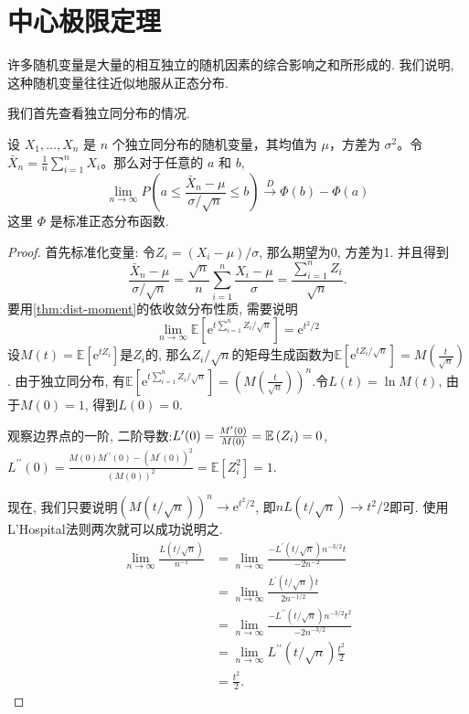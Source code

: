 \section{中心极限定理}

许多随机变量是大量的相互独立的随机因素的综合影响之和所形成的. 我们说明, 这种随机变量往往近似地服从正态分布.

我们首先查看独立同分布的情况. 

\begin{theorem}
    \label{thm:clt-iid}
    设 $X_1, \ldots, X_n$ 是 $n$ 个独立同分布的随机变量，其均值为 $\mu$，方差为 $\sigma^2$。令 $\bar{X}_n=\frac{1}{n} \sum_{i=1}^n X_i$。那么对于任意的 $a$ 和 $b$, 
    $$
    \lim _{n \rightarrow \infty} P\left(a \leq \frac{\bar{X}_n-\mu}{\sigma / \sqrt{n}} \leq b\right) \stackrel{D}{\longrightarrow} \Phi(b)-\Phi(a)
    $$
    这里 $\Phi$ 是标准正态分布函数. 
        \end{theorem}

    \begin{proof}
        首先标准化变量: 令$Z_i=\left(X_i-\mu\right) / \sigma$, 那么期望为0, 方差为1. 并且得到$$
            \frac{\bar{X}_n-\mu}{\sigma / \sqrt{n}}=\frac{\sqrt{n}}{n} \sum_{i=1}^n \frac{X_i-\mu}{\sigma}=\frac{\sum_{i=1}^n Z_i}{\sqrt{n}} .
            $$
            要用\cref{thm:dist-moment}的依收敛分布性质, 需要说明$$
            \lim _{n \rightarrow \infty} \mathbb{E}\left[\mathrm{e}^{t \sum_{i=1}^n Z_i / \sqrt{n}}\right]=\mathrm{e}^{t^2 / 2}
            $$
            设$M(t)=\mathbb{E}\left[\mathrm{e}^{t Z_i}\right]$是$Z_i$的, 那么$Z_i / \sqrt{n}$的矩母生成函数为$\mathbb{E}\left[\mathrm{e}^{t Z_i / \sqrt{n}}\right]=M\left(\frac{t}{\sqrt{n}}\right)$. 由于独立同分布, 有$\mathbb{E}\left[\mathrm{e}^{t \sum_{i=1}^n Z_i / \sqrt{n}}\right]=\left(M\left(\frac{t}{\sqrt{n}}\right)\right)^n$.令$L(t)=\ln M(t)$, 由于$M(0)=1$, 得到$L(0)=0$.

            观察边界点的一阶, 二阶导数:$L^{\prime}(0)=\frac{M^{\prime}(0)}{M(0)}=\mathbb E\left(Z_i\right)=0$, $L^{\prime \prime}(0)=\frac{M(0) M^{\prime \prime}(0)-\left(M^{\prime}(0)\right)^2}{(M(0))^2}=\mathbb{E}\left[Z_i^2\right]=1$.

            现在, 我们只要说明$(M(t / \sqrt{n}))^n \rightarrow \mathrm{e}^{t^2 / 2}$, 即$n L(t / \sqrt{n}) \rightarrow t^2 / 2$即可. 
            使用L'Hospital法则两次就可以成功说明之.
        $$\begin{aligned} \lim _{n \rightarrow \infty} \frac{L(t / \sqrt{n})}{n^{-1}} & =\lim _{n \rightarrow \infty} \frac{-L^{\prime}(t / \sqrt{n}) n^{-3 / 2} t}{-2 n^{-2}} \\ & =\lim _{n \rightarrow \infty} \frac{L^{\prime}(t / \sqrt{n}) t}{2 n^{-1 / 2}} \\ & =\lim _{n \rightarrow \infty} \frac{-L^{\prime \prime}(t / \sqrt{n}) n^{-3 / 2} t^2}{-2 n^{-3 / 2}} \\ & =\lim _{n \rightarrow \infty} L^{\prime \prime}(t / \sqrt{n}) \frac{t^2}{2} \\ & =\frac{t^2}{2} .\end{aligned}$$

    \end{proof}

